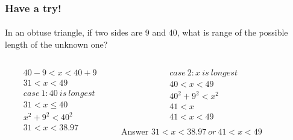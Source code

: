 \documentclass[
	11pt, %
]{beamer}
\begin{document}
\begin{frame}
	\frametitle{Have a try!}
	\framesubtitle{}
In an obtuse triangle, if two sides are 9 and 40, what is range of the possible length of the unknown
one?\\ \pause

	\begin{columns}[t] 
		\begin{column}{0.25\textwidth} %

			\begin{equation*}
				\begin{aligned}
				& 40 - 9<x<40+9\\
				& 31 < x < 49\\
				& case \ 1: 40 \ is \ longest\\
				&31 < x \leq 40 \\
				& x^2 + 9^2 < 40^2 \\
				& 31 < x < 38.97 \\
				\end{aligned}
			\end{equation*}			
		\end{column}

				\begin{column}{0.25\textwidth} %

			\begin{equation*}
				\begin{aligned}
				& case \ 2: x \ is \ longest\\
				& 40 < x < 49 \\
				& 40^2 + 9^2 < x^2 \\
				& 41 < x  \\
				& 41 < x < 49 \\
				\end{aligned}
			\end{equation*}			
		Answer \textbf{$31 < x < 38.97 \ or\  41 < x < 49$}
		\end{column}

		\begin{column}{0.45\textwidth} %


\end{column}
\end{columns}
\end{frame}
\end{document}
